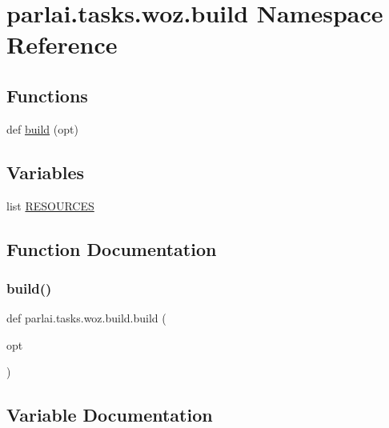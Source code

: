 \hypertarget{namespaceparlai_1_1tasks_1_1woz_1_1build}{}\section{parlai.\+tasks.\+woz.\+build Namespace Reference}
\label{namespaceparlai_1_1tasks_1_1woz_1_1build}
\subsection*{Functions}
\begin{DoxyCompactItemize}
\item 
def \hyperlink{namespaceparlai_1_1tasks_1_1woz_1_1build_ab38bcd37eac166f65dd77a51c0d8e934}{build} (opt)
\end{DoxyCompactItemize}
\subsection*{Variables}
\begin{DoxyCompactItemize}
\item 
list \hyperlink{namespaceparlai_1_1tasks_1_1woz_1_1build_a979b2a57ef2835edb7ef275a7f6b6d23}{R\+E\+S\+O\+U\+R\+C\+ES}
\end{DoxyCompactItemize}


\subsection{Function Documentation}
\mbox{\label{namespaceparlai_1_1tasks_1_1woz_1_1build_ab38bcd37eac166f65dd77a51c0d8e934}} 
\subsubsection{\texorpdfstring{build()}{build()}}
{\footnotesize\ttfamily def parlai.\+tasks.\+woz.\+build.\+build (\begin{DoxyParamCaption}\item[{}]{opt }\end{DoxyParamCaption})}



\subsection{Variable Documentation}
\mbox{\label{namespaceparlai_1_1tasks_1_1woz_1_1build_a979b2a57ef2835edb7ef275a7f6b6d23}} 

